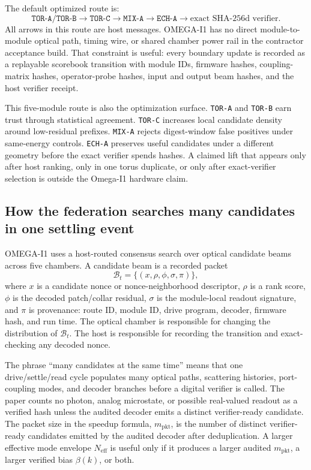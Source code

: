 \documentclass[11pt]{article}
\theoremstyle{definition}
\theoremstyle{remark}
\begin{document}
The default optimized route is:
\[
\texttt{TOR-A/TOR-B}
\longrightarrow
\texttt{TOR-C}
\longrightarrow
\texttt{MIX-A}
\longrightarrow
\texttt{ECH-A}
\longrightarrow
\text{exact SHA-256d verifier}.
\]
All arrows in this route are host messages. OMEGA-I1 has no direct
module-to-module optical path, timing wire, or shared chamber power rail in the
contractor acceptance build. That constraint is useful: every boundary update is
recorded as a replayable scorebook transition with module IDs, firmware hashes,
coupling-matrix hashes, operator-probe hashes, input and output beam hashes, and
the host verifier receipt.

This five-module route is also the optimization surface. \texttt{TOR-A} and
\texttt{TOR-B} earn trust through statistical agreement. \texttt{TOR-C}
increases local candidate density around low-residual prefixes. \texttt{MIX-A}
rejects digest-window false positives under same-energy controls.
\texttt{ECH-A} preserves useful candidates under a different geometry before the
exact verifier spends hashes. A claimed lift that appears only after host
ranking, only in one torus duplicate, or only after exact-verifier selection is
outside the Omega-I1 hardware claim.

\subsection{How the federation searches many candidates in one settling event}

OMEGA-I1 uses a host-routed consensus search over optical candidate beams across
five chambers. A candidate beam is a recorded packet
\[
\mathcal B_t=\{(x,\rho,\phi,\sigma,\pi)\},
\]
where \(x\) is a candidate nonce or nonce-neighborhood descriptor, \(\rho\) is a
rank score, \(\phi\) is the decoded patch/collar residual, \(\sigma\) is the
module-local readout signature, and \(\pi\) is provenance: route ID, module ID,
drive program, decoder, firmware hash, and run time. The optical chamber is
responsible for changing the distribution of \(\mathcal B_t\). The host is
responsible for recording the transition and exact-checking any decoded nonce.

The phrase ``many candidates at the same time'' means that one drive/settle/read
cycle populates many optical paths, scattering histories, port-coupling modes,
and decoder branches before a digital verifier is called. The paper counts no
photon, analog microstate, or possible real-valued readout as a verified hash
unless the audited decoder emits a distinct verifier-ready candidate. The packet
size in the speedup formula, \(m_{\mathrm{pkt}}\), is the number of distinct
verifier-ready candidates emitted by the audited decoder after deduplication. A
larger effective mode envelope
\(N_{\mathrm{eff}}\) is useful only if it produces a larger audited
\(m_{\mathrm{pkt}}\), a larger verified bias \(\beta(k)\), or both.
\end{document}
